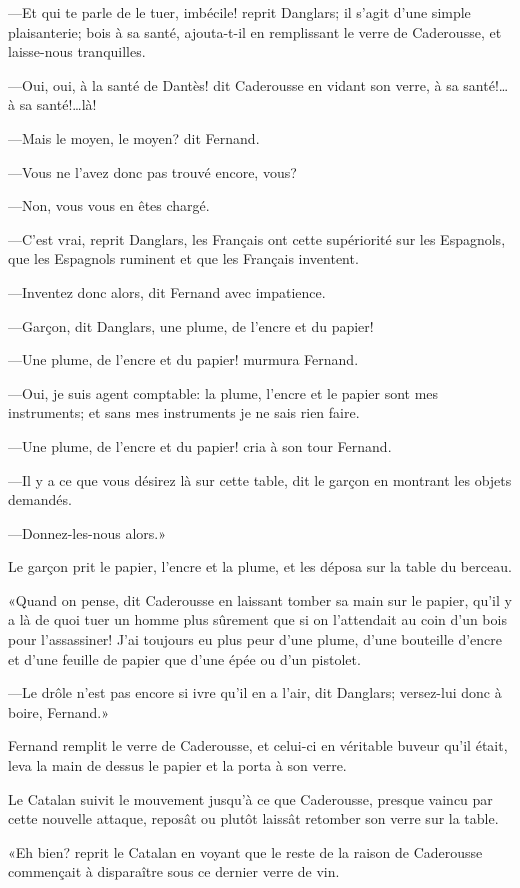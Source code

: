 —Et qui te parle de le tuer, imbécile! reprit Danglars; il s'agit d'une simple plaisanterie; bois à sa santé, ajouta-t-il en remplissant le verre de Caderousse, et laisse-nous tranquilles.

—Oui, oui, à la santé de Dantès! dit Caderousse en vidant son verre, à sa santé!\dots à sa santé!\dots là!

—Mais le moyen, le moyen? dit Fernand.

—Vous ne l'avez donc pas trouvé encore, vous?

—Non, vous vous en êtes chargé.

—C'est vrai, reprit Danglars, les Français ont cette supériorité sur les Espagnols, que les Espagnols ruminent et que les Français inventent.

—Inventez donc alors, dit Fernand avec impatience.

—Garçon, dit Danglars, une plume, de l'encre et du papier!

—Une plume, de l'encre et du papier! murmura Fernand.

—Oui, je suis agent comptable: la plume, l'encre et le papier sont mes instruments; et sans mes instruments je ne sais rien faire.

—Une plume, de l'encre et du papier! cria à son tour Fernand.

—Il y a ce que vous désirez là sur cette table, dit le garçon en montrant les objets demandés.

—Donnez-les-nous alors.»

Le garçon prit le papier, l'encre et la plume, et les déposa sur la table du berceau.

«Quand on pense, dit Caderousse en laissant tomber sa main sur le papier, qu'il y a là de quoi tuer un homme plus sûrement que si on l'attendait au coin d'un bois pour l'assassiner! J'ai toujours eu plus peur d'une plume, d'une bouteille d'encre et d'une feuille de papier que d'une épée ou d'un pistolet.

—Le drôle n'est pas encore si ivre qu'il en a l'air, dit Danglars; versez-lui donc à boire, Fernand.»

Fernand remplit le verre de Caderousse, et celui-ci en véritable buveur qu'il était, leva la main de dessus le papier et la porta à son verre.

Le Catalan suivit le mouvement jusqu'à ce que Caderousse, presque vaincu par cette nouvelle attaque, reposât ou plutôt laissât retomber son verre sur la table.

«Eh bien? reprit le Catalan en voyant que le reste de la raison de Caderousse commençait à disparaître sous ce dernier verre de vin.


